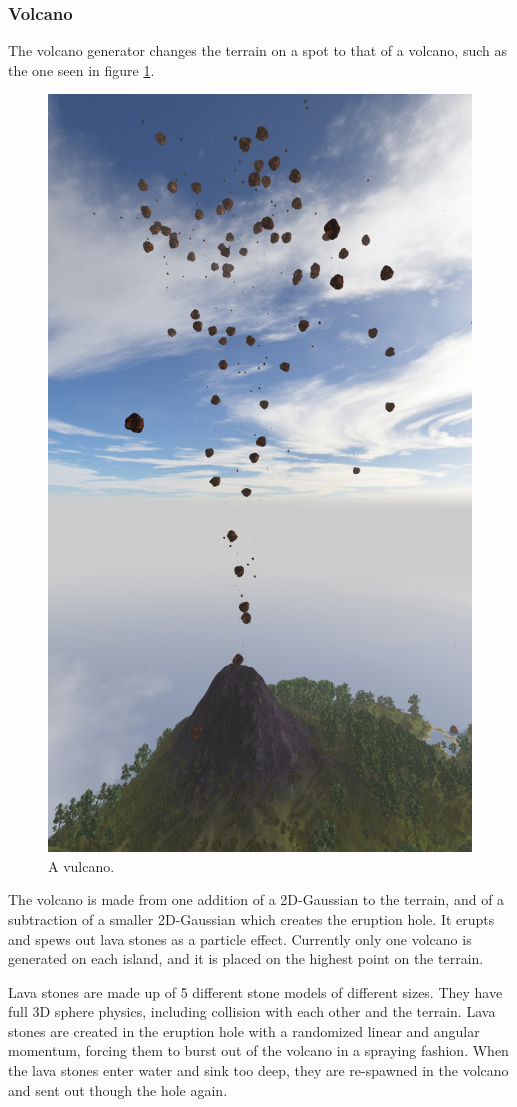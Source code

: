 \subsubsection{Volcano}
The volcano generator changes the terrain on a spot to that of a volcano, such as the one seen in figure \ref{fig:volcano1}.
\begin{figure}[H]
  \centering
  \includegraphics[width=0.7\linewidth]{images/volcano.jpg}
  \caption{A vulcano.}
  \label{fig:volcano1}
\end{figure}%
The volcano is made from one addition of a 2D-Gaussian to the terrain, and of a subtraction of a smaller 2D-Gaussian which creates the eruption hole. It erupts and spews out lava stones as a particle effect. Currently only one volcano is generated on each island, and it is placed on the highest point on the terrain.

Lava stones are made up of 5 different stone models of different sizes. They have full 3D sphere physics, including collision with each other and the terrain. Lava stones are created in the eruption hole with a randomized linear and angular momentum, forcing them to burst out of the volcano in a spraying fashion. When the lava stones enter water and sink too deep, they are re-spawned in the volcano and sent out though the hole again.

